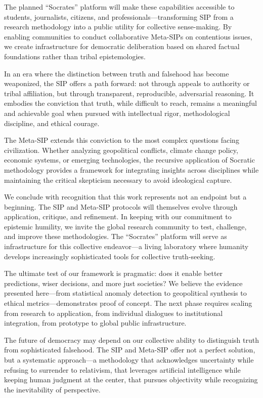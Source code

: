 \documentclass[11pt,a4paper]{article}
\begin{document}
\begin{small}
The planned ``Socrates'' platform will make these capabilities accessible to students, journalists, citizens, and professionals---transforming SIP from a research methodology into a public utility for collective sense-making. By enabling communities to conduct collaborative Meta-SIPs on contentious issues, we create infrastructure for democratic deliberation based on shared factual foundations rather than tribal epistemologies.

In an era where the distinction between truth and falsehood has become weaponized, the SIP offers a path forward: not through appeals to authority or tribal affiliation, but through transparent, reproducible, adversarial reasoning. It embodies the conviction that truth, while difficult to reach, remains a meaningful and achievable goal when pursued with intellectual rigor, methodological discipline, and ethical courage.

The Meta-SIP extends this conviction to the most complex questions facing civilization. Whether analyzing geopolitical conflicts, climate change policy, economic systems, or emerging technologies, the recursive application of Socratic methodology provides a framework for integrating insights across disciplines while maintaining the critical skepticism necessary to avoid ideological capture.

We conclude with recognition that this work represents not an endpoint but a beginning. The SIP and Meta-SIP protocols will themselves evolve through application, critique, and refinement. In keeping with our commitment to epistemic humility, we invite the global research community to test, challenge, and improve these methodologies. The ``Socrates'' platform will serve as infrastructure for this collective endeavor---a living laboratory where humanity develops increasingly sophisticated tools for collective truth-seeking.

The ultimate test of our framework is pragmatic: does it enable better predictions, wiser decisions, and more just societies? We believe the evidence presented here---from statistical anomaly detection to geopolitical synthesis to ethical metrics---demonstrates proof of concept. The next phase requires scaling from research to application, from individual dialogues to institutional integration, from prototype to global public infrastructure.

The future of democracy may depend on our collective ability to distinguish truth from sophisticated falsehood. The SIP and Meta-SIP offer not a perfect solution, but a systematic approach---a methodology that acknowledges uncertainty while refusing to surrender to relativism, that leverages artificial intelligence while keeping human judgment at the center, that pursues objectivity while recognizing the inevitability of perspective.


\end{small}
\end{document}
